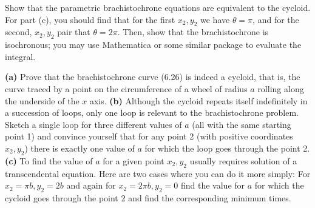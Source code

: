 \documentclass[11pt,letterpaper,boxed]{../hmcpset}
\begin{document}
\newpage

\begin{problem}[iv \& v]
Show that the parametric brachistochrone equations are equivalent to the cycloid. For part (c), you should find that for the first $x_2, y_2$ we have $\theta = \pi$, and for the second, $x_2, y_2$ pair that $\theta = 2\pi$. Then, show that the brachistochrone is isochronous; you may use Mathematica or some similar package to evaluate the integral.

\begin{problem}[6.14]
\textbf{(a)} Prove that the brachistochrone curve (6.26) is indeed a cycloid, that is, the curve traced by a point on the circumference of a wheel of radius $a$ rolling along the underside of the $x$ axis. \textbf{(b)} Although the cycloid repeats itself indefinitely in a succession of loops, only one loop is relevant to the brachistochrone problem. Sketch a single loop for three different values of $a$ (all with the same starting point 1) and convince yourself that for any point 2 (with positive coordinates $x_2, y_2$) there is exactly one value of $a$ for which the loop goes through the point 2. \textbf{(c)} To find the value of $a$ for a given point $x_2, y_2$ usually requires solution of a transcendental equation. Here are two cases where you can do it more simply: For $x_2 = \pi b, y_2 = 2b$ and again for $x_2 = 2\pi b, y_2 = 0$ find the value for $a$ for which the cycloid goes through the point 2 and find the corresponding minimum times.\\


\end{problem}
\end{problem}
\end{document}
